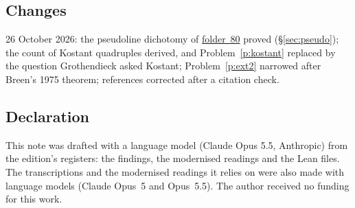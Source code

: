 \documentclass[11pt]{article}
\newcommand{\fac}[1]{\href{https://grothendieck.umontpellier.fr/#1.pdf}{folder~#1}}
\theoremstyle{definition}
\theoremstyle{plain}\newtheorem*{proposition}{Proposition}\theoremstyle{definition}
\begin{document}
\subsection*{Changes}
26 October 2026: the pseudoline dichotomy of \fac{80} proved (\S\ref{sec:pseudo}); the count of Kostant quadruples derived, and Problem~\ref{p:kostant} replaced by the question Grothendieck asked Kostant; Problem~\ref{p:ext2} narrowed after Breen's 1975 theorem; references corrected after a citation check.

\subsection*{Declaration}
This note was drafted with a language model (Claude Opus 5.5, Anthropic) from the edition's registers: the findings, the modernised readings and the Lean files. The transcriptions and the modernised readings it relies on were also made with language models (Claude Opus~5 and Opus~5.5). The author received no funding for this work.
\end{document}
